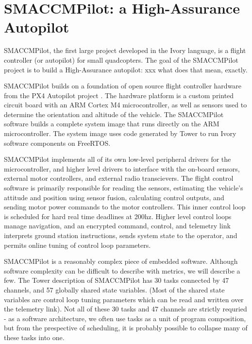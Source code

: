 \section{SMACCMPilot: a High-Assurance Autopilot}

SMACCMPilot, the first large project developed in the Ivory language, is a
flight controller (or autopilot) for small quadcopters. The goal of the
SMACCMPilot project is to build a High-Assurance autopilot: xxx what does that
mean, exactly.

SMACCMPilot builds on a foundation of open source flight controller hardware
from the PX4 Autopilot project . The hardware platform is a
custom printed circuit board with an ARM Cortex M4 microcontroller, as well as
sensors used to determine the orientation and altitude of the vehicle.
 The
SMACCMPilot software builds a complete system image that runs directly on the
ARM microcontroller. The system image uses code generated by Tower to run Ivory
software components on FreeRTOS.

SMACCMPilot implements all of its own low-level peripheral drivers for the
microcontroller, and higher level drivers to interface with the on-board
sensors, external motor controllers, and external radio transcievers. The flight
control software is primarily responsible for reading the sensors, estimating
the vehicle's attitude and position using sensor fusion, calculating control
outputs, and sending motor power commands to the motor controllers. This inner
control loop is scheduled for hard real time deadlines at 200hz. Higher level
control loops manage navigation, and an encrypted command, control, and
telemetry link interprets ground station instructions, sends system state to
the operator, and permits online tuning of control loop parameters.

SMACCMPilot is a reasonably complex piece of embedded software. Although
software complexity can be difficult to describe with metrics, we will describe
a few.
The Tower description of SMACCMPilot has 30 tasks connected by 47 channels, and
57 globally shared state variables. (Most of the shared state variables are
control loop tuning parameters which can be read and written over the telemetry
link). Not all of these 30 tasks and 47 channels are strictly
requried - as a software architecture, we often use tasks as a unit of
program composition, but from the prespective of scheduling, it is probably
possible to collapse many of these tasks into one.

